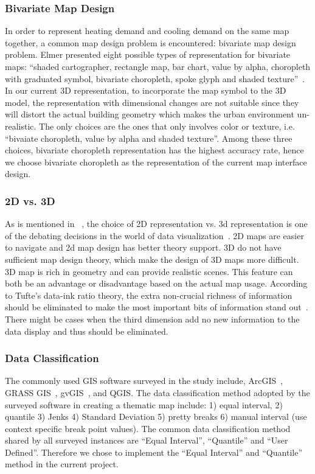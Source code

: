 \documentclass[hidelinks,12pt]{article}
\begin{document}
\subsubsection{Bivariate Map Design} \label{bivariate} In order to
represent heating demand and cooling demand on the same map together,
a common map design problem is encountered: bivariate map design
problem. Elmer presented eight possible types of representation for
bivariate maps: ``shaded cartographer, rectangle map, bar chart, value
by alpha, choropleth with graduated symbol, bivariate choropleth,
spoke glyph and shaded texture''~\cite{Elmer2012}. In our current 3D
representation, to incorporate the map symbol to the 3D model, the
representation with dimensional changes are not suitable since they
will distort the actual building geometry which makes the urban
environment un-realistic. The only choices are the ones that only
involves color or texture, i.e. ``bivaiate choropleth, value by alpha
and shaded texture''. Among these three choices, bivariate choropleth
representation has the highest accuracy rate, hence we choose
bivariate choropleth as the representation of the current map
interface design.

\subsubsection{2D vs. 3D} \label{2d3d} 

As is mentioned in ~\cite{Brownrigg2005}, the choice of 2D
representation vs. 3d representation is one of the debating decisions
in the world of data visualization~\cite{Brownrigg2005}. 2D maps are
easier to navigate and 2d map design has better theory support.  3D do
not have sufficient map design theory, which make the design of 3D
maps more difficult. 3D map is rich in geometry and can provide
realistic scenes. This feature can both be an advantage or
disadvantage based on the actual map usage. According to Tufte's
data-ink ratio theory, the extra non-crucial richness of information
should be eliminated to make the most important bits of information
stand out~\cite{Tufte83}. There might be cases when the third
dimension add no new information to the data display and thus should
be eliminated.

\subsubsection{Data Classification}\label{dataClassification}
The commonly used GIS software surveyed in the study include,
ArcGIS~\cite{GIS_Jenks2014}, GRASS GIS~\cite{GRASSGIS2008},
gvGIS~\cite{gvGIS2011}, and QGIS. The data classification method
adopted by the surveyed software in creating a thematic map include:
1) equal interval, 2) quantile 3) Jenks 4) Standard Deviation
5) pretty breaks 6) manual interval (use context specific
break point values). The common data classification method shared by
all surveyed instances are ``Equal Interval'', ``Quantile'' and ``User
Defined''. Therefore we chose to implement the ``Equal Interval'' and
``Quantile'' method in the current project.
\end{document}
